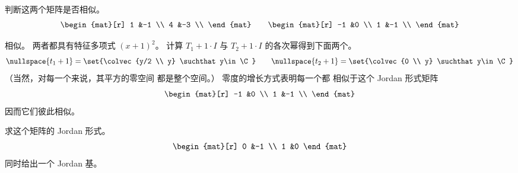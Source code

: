    \recommended \item 
      判断这两个矩阵是否相似。
      \begin{equation*}
         \begin{mat}[r]
            1  &-1 \\
            4  &-3 \\
         \end{mat}
         \qquad
         \begin{mat}[r]
           -1  &0  \\
            1  &-1 \\
         \end{mat}
      \end{equation*}
      \begin{answer}
        相似。
        两者都具有特征多项式 $(x+1)^2$。
        计算 $T_1+1\cdot I$ 与
        $T_2+1\cdot I$ 的各次幂得到下面两个。
        \begin{equation*}
          \nullspace{t_1+1}=\set{\colvec{y/2 \\ y} \suchthat y\in\C}
          \qquad
          \nullspace{t_2+1}=\set{\colvec{0 \\ y} \suchthat y\in\C}
        \end{equation*}
        （当然，对每一个来说，其平方的零空间
        都是整个空间。）
        零度的增长方式表明每一个都
        相似于这个 Jordan 形式矩阵
        \begin{equation*}
           \begin{mat}[r]
             -1  &0  \\
              1  &-1 \\
           \end{mat}
        \end{equation*}
        因而它们彼此相似。  
      \end{answer}
  \item 
     求这个矩阵的 Jordan 形式。
     \begin{equation*}
        \begin{mat}[r]
           0  &-1  \\
           1  &0
        \end{mat}
     \end{equation*}
     同时给出一个 Jordan 基。
